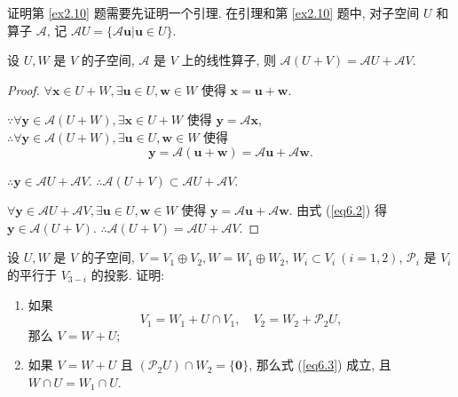\documentclass[color=black,device=normal,lang=cn,mode=geye]{elegantnote}
\begin{document}
证明第 \ref{ex2.10} 题需要先证明一个引理. 在引理和第 \ref{ex2.10} 题中, 对子空间 $U$ 和算子 $\mathcal{A}$, 记 $\mathcal{A}U=\{\mathcal{A}\boldsymbol{u}|\boldsymbol{u}\in U\}$.
\begin{lemma}\label{l6.4}
    设 $U,W$ 是 $V$ 的子空间, $\mathcal{A}$ 是 $V$ 上的线性算子, 则 $\mathcal{A}(U+V)=\mathcal{A}U+\mathcal{A}V$.
\end{lemma}
\begin{proof}
    $\forall\boldsymbol{x}\in U+W,\exists\boldsymbol{u}\in U,\boldsymbol{w}\in W$ 使得 $\boldsymbol{x}=\boldsymbol{u}+\boldsymbol{w}$.

    $\because\forall\boldsymbol{y}\in\mathcal{A}(U+W),\exists\boldsymbol{x}\in U+W$ 使得 $\boldsymbol{y}=\mathcal{A}\boldsymbol{x}$, $\therefore\forall\boldsymbol{y}\in\mathcal{A}(U+W),\exists\boldsymbol{u}\in U,\boldsymbol{w}\in W$ 使得
    \begin{equation}\label{eq6.2}
        \boldsymbol{y}=\mathcal{A}(\boldsymbol{u}+\boldsymbol{w})=\mathcal{A}\boldsymbol{u}+\mathcal{A}\boldsymbol{w}.
    \end{equation}

    $\therefore\boldsymbol{y}\in\mathcal{A}U+\mathcal{A}V$. $\therefore\mathcal{A}(U+V)\subset\mathcal{A}U+\mathcal{A}V$.

    $\forall\boldsymbol{y}\in\mathcal{A}U+\mathcal{A}V,\exists\boldsymbol{u}\in U,\boldsymbol{w}\in W$ 使得 $\boldsymbol{y}=\mathcal{A}\boldsymbol{u}+\mathcal{A}\boldsymbol{w}$. 由式 (\ref{eq6.2}) 得 $\boldsymbol{y}\in\mathcal{A}(U+V)$. $\therefore\mathcal{A}(U+V)=\mathcal{A}U+\mathcal{A}V$.
\end{proof}
\begin{exercise}\label{ex2.10}
    设 $U,W$ 是 $V$ 的子空间, $V=V_1\oplus V_2,W=W_1\oplus W_2$, $W_i\subset V_i\ (i=1,2)$, $\mathcal{P}_i$ 是 $V_i$ 的平行于 $V_{3-i}$ 的投影. 证明:
    \begin{enumerate}
        \def\labelenumi{(\arabic{enumi})}
        \item 如果
        \begin{equation}\label{eq6.3}
            V_1=W_1+U\cap V_1,\quad V_2=W_2+\mathcal{P}_2U,
        \end{equation}
        那么 $V=W+U$;
        \item 如果 $V=W+U$ 且 $(\mathcal{P}_2U)\cap W_2=\{\boldsymbol{0}\}$, 那么式 (\ref{eq6.3}) 成立, 且 $W\cap U=W_1\cap U$.
    \end{enumerate}
\end{exercise}
\end{document}
